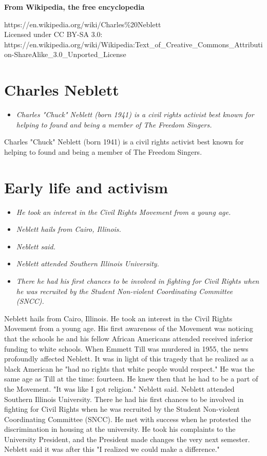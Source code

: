 \textbf{From Wikipedia, the free encyclopedia}

https://en.wikipedia.org/wiki/Charles\%20Neblett\\
Licensed under CC BY-SA 3.0:\\
https://en.wikipedia.org/wiki/Wikipedia:Text\_of\_Creative\_Commons\_Attribution-ShareAlike\_3.0\_Unported\_License

\section{Charles Neblett}\label{charles-neblett}

\begin{itemize}
\item
  \emph{Charles "Chuck" Neblett (born 1941) is a civil rights activist
  best known for helping to found and being a member of The Freedom
  Singers.}
\end{itemize}

Charles "Chuck" Neblett (born 1941) is a civil rights activist best
known for helping to found and being a member of The Freedom Singers.

\section{Early life and activism}\label{early-life-and-activism}

\begin{itemize}
\item
  \emph{He took an interest in the Civil Rights Movement from a young
  age.}
\item
  \emph{Neblett hails from Cairo, Illinois.}
\item
  \emph{Neblett said.}
\item
  \emph{Neblett attended Southern Illinois University.}
\item
  \emph{There he had his first chances to be involved in fighting for
  Civil Rights when he was recruited by the Student Non-violent
  Coordinating Committee (SNCC).}
\end{itemize}

Neblett hails from Cairo, Illinois. He took an interest in the Civil
Rights Movement from a young age. His first awareness of the Movement
was noticing that the schools he and his fellow African Americans
attended received inferior funding to white schools. When Emmett Till
was murdered in 1955, the news profoundly affected Neblett. It was in
light of this tragedy that he realized as a black American he "had no
rights that white people would respect." He was the same age as Till at
the time: fourteen. He knew then that he had to be a part of the
Movement. "It was like I got religion." Neblett said. Neblett attended
Southern Illinois University. There he had his first chances to be
involved in fighting for Civil Rights when he was recruited by the
Student Non-violent Coordinating Committee (SNCC). He met with success
when he protested the discrimination in housing at the university. He
took his complaints to the University President, and the President made
changes the very next semester. Neblett said it was after this "I
realized we could make a difference."

